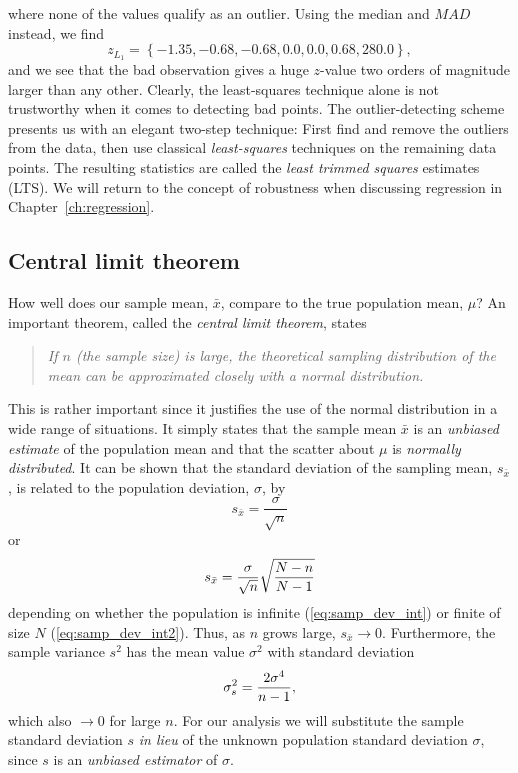 where none of the values qualify as an outlier.  Using the median and $MAD$ instead, we find
\begin{equation}
z_{\scriptscriptstyle L_{\scriptscriptstyle 1}}
 = \left \{ -1.35, -0.68, -0.68, 0.0, 0.0, 0.68, 280.0 \right \},
\end{equation}
and we see that the bad observation gives a huge $z$-value two orders of magnitude larger than any other.  
Clearly, the least-squares technique alone is not trustworthy when it comes to detecting bad 
points.  The outlier-detecting scheme presents us with an elegant two-step technique:  First find and remove 
the outliers from the data, then use classical \emph{least-squares} techniques on the remaining data 
points.  The resulting statistics are called the \emph{least trimmed squares} estimates (LTS).  We 
will return to the concept of robustness when discussing regression in Chapter~\ref{ch:regression}.

\subsection{Central limit theorem}

	How well does our sample mean, $\bar{x}$, compare to the true population mean, $\mu$?  An important 
theorem, called the \emph{central limit theorem}, states 
\begin{quote}
\emph{If $n$ (the sample size) is large, the theoretical sampling distribution of the mean 
can be approximated closely with a normal distribution.}
\end{quote}
This is rather important since it justifies the use of the normal distribution in a wide range of 
situations.  It simply states that the sample mean $\bar{x}$ is an \emph{unbiased estimate} of the population 
mean and that the scatter about $\mu$ is \emph{normally distributed}.  It can be shown that the standard 
deviation of the sampling mean, $s_{\bar{x}}$, is related to the population deviation, $\sigma$, by
\begin{equation}
s_{\bar{x}} = \frac{\sigma} {\sqrt{n}}
\label{eq:samp_dev_int}
\end{equation}
or
\begin{equation}
	\index{Sample!mean}
s_{\bar{x}} = \frac{\sigma} {\sqrt{n}} \sqrt{\frac{N-n}{N-1}}
\label{eq:samp_dev_int2}
\end{equation}
depending on whether the population is infinite (\ref{eq:samp_dev_int}) or finite of size $N$ (\ref{eq:samp_dev_int2}).  Thus, as $n$ 
grows large, $s_{\bar{x}} \rightarrow 0$.   Furthermore, the sample variance $s^2$ has the mean value $\sigma^2$ with 
standard deviation
\begin{equation}
	\index{Sample!variance}
\sigma^2_s = \frac{2\sigma^4 }{n-1},
\end{equation}
which also $\rightarrow 0$ for large $n$.  For our analysis we will substitute the sample standard deviation
$s$ \emph{in lieu} of the unknown population standard deviation $\sigma$, since $s$ is an \emph{unbiased estimator} of $\sigma$.

